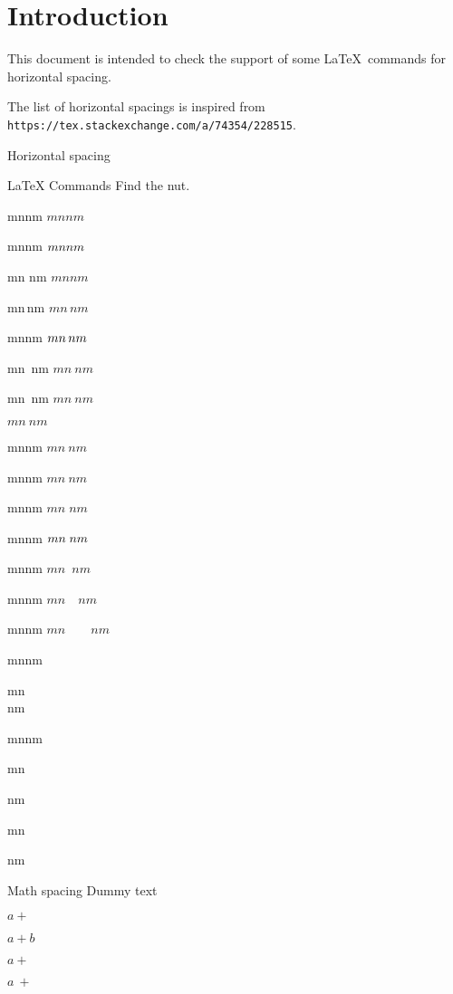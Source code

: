 \documentclass{article}
\begin{document}
\section*{Introduction}

This document is intended to check the support of some \LaTeX\ commands for 
horizontal spacing.

The list of horizontal spacings is inspired from 
\texttt{https://tex.stackexchange.com/a/74354/228515}.

\begin{quiz}[points=1.0]{Horizontal spacing}
\begin{multi}[shuffle=false]{LaTeX Commands}
Find the nut.
\item mnnm \quad $mnnm$
\item mn\space nm \quad $mn\space nm$
\item mn nm \quad $mn nm$
\item mn\,nm \quad $mn\,nm$
\item mn\thinspace nm \quad $ mn\thinspace nm$
\item mn~nm \quad $mn~nm$
\item mn\ nm \quad $mn\ nm$
\item $mn\>nm$ %
\item mn\:nm \quad $mn\:nm$
\item mn\medspace nm \quad $mn\medspace nm$
\item mn\;nm \quad $mn\;nm$
\item mn\thickspace nm \quad $mn\thickspace nm$
\item* mn\enspace nm \quad $mn\enspace nm$
\item mn\quad nm \quad $mn\quad nm$
\item mn\qquad nm \quad $mn\qquad nm$
\item mn\textvisiblespace nm
\item mn\\nm
\item mn\newline nm
\item mn%

nm
\item mn\par nm
\end{multi}
\begin{multi}[shuffle=false]{Math spacing}
Dummy text{}
\item $a+$
\item $a+b$
\item* $a+{}$
\item $a\ +$
\end{multi}
\end{quiz}
\end{document}
